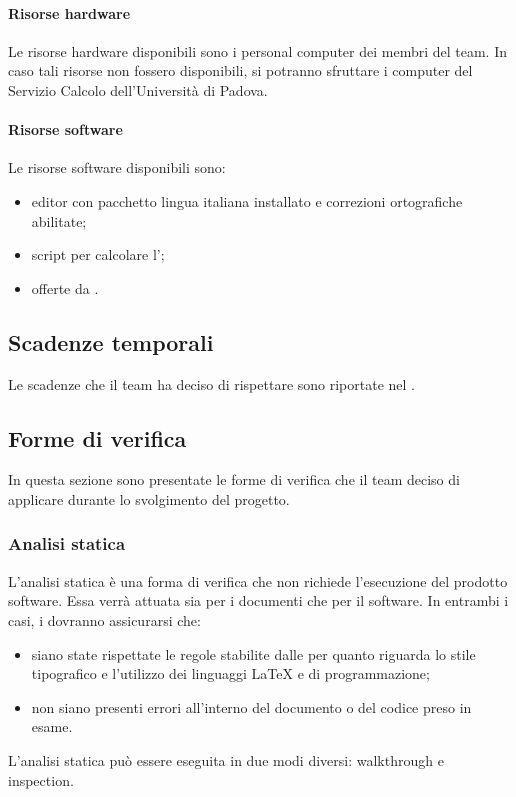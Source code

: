 				\paragraph{Risorse hardware}
					Le risorse hardware disponibili sono i personal computer dei membri del team. In caso tali risorse non fossero disponibili, si potranno sfruttare i computer del Servizio Calcolo dell'Università di Padova.
				\paragraph{Risorse software}
					Le risorse software disponibili sono:
					\begin{itemize}
						\item editor  con pacchetto lingua italiana installato e correzioni ortografiche abilitate;
						\item script per calcolare l';
						\item {} offerte da .
					\end{itemize}
		\subsection{Scadenze temporali}
			Le scadenze che il team ha deciso di rispettare sono riportate nel \pdpv.
		\subsection{Forme di verifica}
			
			In questa sezione sono presentate le forme di verifica che il team deciso di applicare durante lo svolgimento del progetto.
			
			\subsubsection{Analisi statica}
				L'analisi statica è una forma di verifica che non richiede l'esecuzione del prodotto software. Essa verrà attuata sia per i documenti che per il software. In entrambi i casi, i \verificatori{} dovranno assicurarsi che:
				\begin{itemize}
					\item siano state rispettate le regole stabilite dalle \ndp{} per quanto riguarda lo stile tipografico e l'utilizzo dei linguaggi \LaTeX{} e di programmazione;
					\item non siano presenti errori all'interno del documento o del codice preso in esame.
				\end{itemize}
				L'analisi statica può essere eseguita in due modi diversi: walkthrough e inspection.
				
